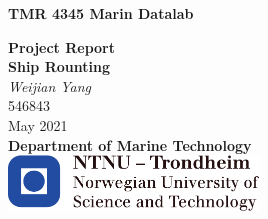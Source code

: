 \documentclass[a4paper, USenglish]{report} %
\begin{document}
\begin{titlepage}
    \begin{center}
    \vspace*{2cm}
    \textbf{\Large TMR 4345 Marin Datalab}\\
    \vspace{1cm}
    
    \textbf{\Huge Project Report}\\
    \vspace{10pt}
    \textbf{\Large Ship Rounting}
    \\
    \vspace{4cm}
    \large 
   \emph{Weijian Yang \vspace{10pt} } \\546843 \vspace{10pt} \\ May 2021 \\
    
    \vspace{4.5cm}
    \textbf{\Large Department of Marine Technology} \\
    \vspace{0.5cm}
    \includegraphics[width=0.5\textwidth]{NTNU.pdf}
    \vspace*{2cm}
    \end{center}
    
    \end{titlepage}
\newpage
\tableofcontents
\thispagestyle{empty} %


\newpage
\setcounter{page}{1}







\newpage


\appendix

\end{document}
